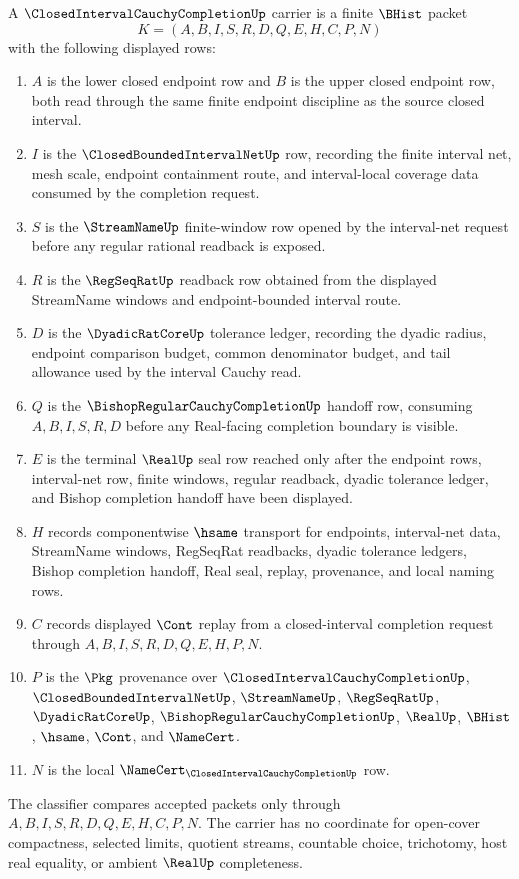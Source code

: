 \begin{definition}
\label{def:closed-interval-cauchy-completion-carrier}
A $\ClosedIntervalCauchyCompletionUp$ carrier is a finite $\BHist$ packet
$$
K=(A,B,I,S,R,D,Q,E,H,C,P,N)
$$
with the following displayed rows:
\begin{enumerate}
\item $A$ is the lower closed endpoint row and $B$ is the upper closed endpoint row, both read through the same finite endpoint discipline as the source closed interval.
\item $I$ is the $\ClosedBoundedIntervalNetUp$ row, recording the finite interval net, mesh scale, endpoint containment route, and interval-local coverage data consumed by the completion request.
\item $S$ is the $\StreamNameUp$ finite-window row opened by the interval-net request before any regular rational readback is exposed.
\item $R$ is the $\RegSeqRatUp$ readback row obtained from the displayed StreamName windows and endpoint-bounded interval route.
\item $D$ is the $\DyadicRatCoreUp$ tolerance ledger, recording the dyadic radius, endpoint comparison budget, common denominator budget, and tail allowance used by the interval Cauchy read.
\item $Q$ is the $\BishopRegularCauchyCompletionUp$ handoff row, consuming $A,B,I,S,R,D$ before any Real-facing completion boundary is visible.
\item $E$ is the terminal $\RealUp$ seal row reached only after the endpoint rows, interval-net row, finite windows, regular readback, dyadic tolerance ledger, and Bishop completion handoff have been displayed.
\item $H$ records componentwise $\hsame$ transport for endpoints, interval-net data, StreamName windows, RegSeqRat readbacks, dyadic tolerance ledgers, Bishop completion handoff, Real seal, replay, provenance, and local naming rows.
\item $C$ records displayed $\Cont$ replay from a closed-interval completion request through $A,B,I,S,R,D,Q,E,H,P,N$.
\item $P$ is the $\Pkg$ provenance over $\ClosedIntervalCauchyCompletionUp$, $\ClosedBoundedIntervalNetUp$, $\StreamNameUp$, $\RegSeqRatUp$, $\DyadicRatCoreUp$, $\BishopRegularCauchyCompletionUp$, $\RealUp$, $\BHist$, $\hsame$, $\Cont$, and $\NameCert$.
\item $N$ is the local $\NameCert_{\ClosedIntervalCauchyCompletionUp}$ row.
\end{enumerate}
The classifier compares accepted packets only through $A,B,I,S,R,D,Q,E,H,C,P,N$. The carrier has no coordinate for open-cover compactness, selected limits, quotient streams, countable choice, trichotomy, host real equality, or ambient $\RealUp$ completeness.
\end{definition}

